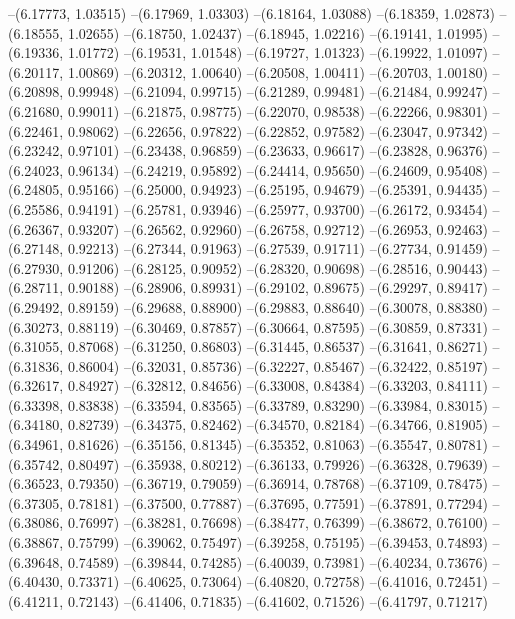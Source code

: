 --(6.17773, 1.03515)
--(6.17969, 1.03303)
--(6.18164, 1.03088)
--(6.18359, 1.02873)
--(6.18555, 1.02655)
--(6.18750, 1.02437)
--(6.18945, 1.02216)
--(6.19141, 1.01995)
--(6.19336, 1.01772)
--(6.19531, 1.01548)
--(6.19727, 1.01323)
--(6.19922, 1.01097)
--(6.20117, 1.00869)
--(6.20312, 1.00640)
--(6.20508, 1.00411)
--(6.20703, 1.00180)
--(6.20898, 0.99948)
--(6.21094, 0.99715)
--(6.21289, 0.99481)
--(6.21484, 0.99247)
--(6.21680, 0.99011)
--(6.21875, 0.98775)
--(6.22070, 0.98538)
--(6.22266, 0.98301)
--(6.22461, 0.98062)
--(6.22656, 0.97822)
--(6.22852, 0.97582)
--(6.23047, 0.97342)
--(6.23242, 0.97101)
--(6.23438, 0.96859)
--(6.23633, 0.96617)
--(6.23828, 0.96376)
--(6.24023, 0.96134)
--(6.24219, 0.95892)
--(6.24414, 0.95650)
--(6.24609, 0.95408)
--(6.24805, 0.95166)
--(6.25000, 0.94923)
--(6.25195, 0.94679)
--(6.25391, 0.94435)
--(6.25586, 0.94191)
--(6.25781, 0.93946)
--(6.25977, 0.93700)
--(6.26172, 0.93454)
--(6.26367, 0.93207)
--(6.26562, 0.92960)
--(6.26758, 0.92712)
--(6.26953, 0.92463)
--(6.27148, 0.92213)
--(6.27344, 0.91963)
--(6.27539, 0.91711)
--(6.27734, 0.91459)
--(6.27930, 0.91206)
--(6.28125, 0.90952)
--(6.28320, 0.90698)
--(6.28516, 0.90443)
--(6.28711, 0.90188)
--(6.28906, 0.89931)
--(6.29102, 0.89675)
--(6.29297, 0.89417)
--(6.29492, 0.89159)
--(6.29688, 0.88900)
--(6.29883, 0.88640)
--(6.30078, 0.88380)
--(6.30273, 0.88119)
--(6.30469, 0.87857)
--(6.30664, 0.87595)
--(6.30859, 0.87331)
--(6.31055, 0.87068)
--(6.31250, 0.86803)
--(6.31445, 0.86537)
--(6.31641, 0.86271)
--(6.31836, 0.86004)
--(6.32031, 0.85736)
--(6.32227, 0.85467)
--(6.32422, 0.85197)
--(6.32617, 0.84927)
--(6.32812, 0.84656)
--(6.33008, 0.84384)
--(6.33203, 0.84111)
--(6.33398, 0.83838)
--(6.33594, 0.83565)
--(6.33789, 0.83290)
--(6.33984, 0.83015)
--(6.34180, 0.82739)
--(6.34375, 0.82462)
--(6.34570, 0.82184)
--(6.34766, 0.81905)
--(6.34961, 0.81626)
--(6.35156, 0.81345)
--(6.35352, 0.81063)
--(6.35547, 0.80781)
--(6.35742, 0.80497)
--(6.35938, 0.80212)
--(6.36133, 0.79926)
--(6.36328, 0.79639)
--(6.36523, 0.79350)
--(6.36719, 0.79059)
--(6.36914, 0.78768)
--(6.37109, 0.78475)
--(6.37305, 0.78181)
--(6.37500, 0.77887)
--(6.37695, 0.77591)
--(6.37891, 0.77294)
--(6.38086, 0.76997)
--(6.38281, 0.76698)
--(6.38477, 0.76399)
--(6.38672, 0.76100)
--(6.38867, 0.75799)
--(6.39062, 0.75497)
--(6.39258, 0.75195)
--(6.39453, 0.74893)
--(6.39648, 0.74589)
--(6.39844, 0.74285)
--(6.40039, 0.73981)
--(6.40234, 0.73676)
--(6.40430, 0.73371)
--(6.40625, 0.73064)
--(6.40820, 0.72758)
--(6.41016, 0.72451)
--(6.41211, 0.72143)
--(6.41406, 0.71835)
--(6.41602, 0.71526)
--(6.41797, 0.71217)
